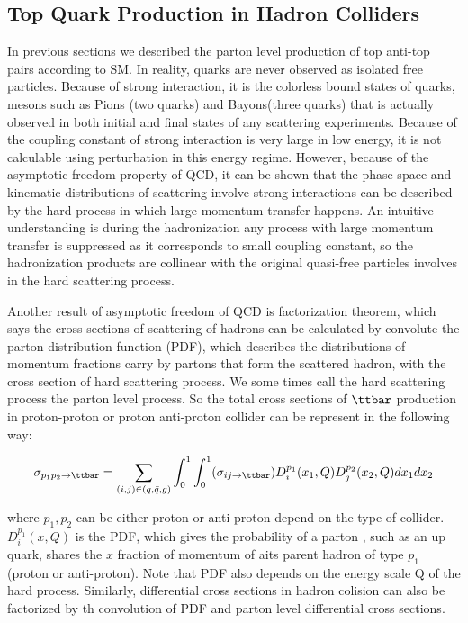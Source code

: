 \subsection{Top Quark Production in Hadron Colliders}
\label{sec:production in LHC}

In previous sections we described the parton level production of top anti-top pairs according to SM. In reality, quarks are never observed as isolated free particles. Because of strong interaction, it is the colorless bound states of quarks, mesons such as Pions (two quarks) and Bayons(three quarks) that is actually observed in both initial and final states of any scattering experiments. Because of the coupling constant of strong interaction is very large in low energy, it is not calculable using perturbation in this energy regime. However, because of the asymptotic freedom property of QCD, it can be shown that the phase space and kinematic distributions of scattering involve strong interactions can be described by the hard process in which large momentum transfer happens. An intuitive understanding is during the hadronization any process with large momentum transfer is suppressed as it corresponds to small coupling constant, so the hadronization products are collinear with the original quasi-free particles involves in the hard scattering process. 

Another result of asymptotic freedom of QCD is factorization theorem, which says the cross sections of scattering of hadrons can be calculated by convolute the parton distribution function (PDF), which describes the distributions of momentum fractions carry by partons that form the scattered hadron,  with the cross section of hard scattering process. We some times call the hard scattering process the parton level process. So the total cross sections of $\ttbar$ production in proton-proton or proton anti-proton collider can be represent in the following way:

\begin{equation}
\sigma_{p_1p_2\rightarrow \ttbar} = \sum_{(i,j)\in(q,\bar q,g)}\int_{0}^{1}\int_{0}^{1}(\sigma_{ij\rightarrow\ttbar})D_i^{p_1}(x_1,Q)D_j^{p_2}(x_2,Q)dx_1dx_2  
\end{equation}  

where $p_1,p_2$ can be either proton or anti-proton depend on the type of collider. $D_i^{p_1}(x,Q)$ is the PDF, which gives the probability of a parton , such as an up quark, shares the $x$ fraction of momentum of aits parent hadron of type $p_1$ (proton or anti-proton). Note that PDF also depends on the energy scale Q of the hard process. Similarly, differential cross sections in hadron colision can also be factorized by th convolution of PDF and parton level differential cross sections.

